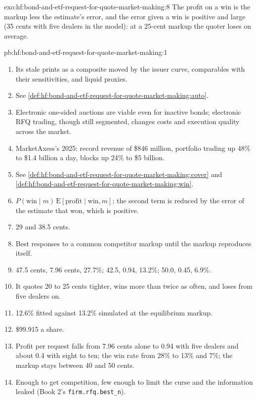 \begin{solution}{exo:hf:bond-and-etf-request-for-quote-market-making:8}
The profit on a win is the markup less the estimate's error, and the error given a win is positive and large (35 cents with five dealers in the
model): at a 25-cent markup the quoter loses on average.
\end{solution}

\begin{solution}{pb:hf:bond-and-etf-request-for-quote-market-making:1}
\begin{enumerate}
\item Its stale prints as a composite moved by the issuer curve, comparables with their sensitivities, and liquid proxies.
\item See \cref{def:hf:bond-and-etf-request-for-quote-market-making:auto}.
\item Electronic one-sided auctions are viable even for inactive bonds; electronic RFQ trading, though still segmented, changes costs and execution
quality across the market.
\item MarketAxess's 2025: record revenue of \$846 million, portfolio trading up 48\% to \$1.4 billion a day, blocks up 24\% to \$5 billion.
\item See \cref{def:hf:bond-and-etf-request-for-quote-market-making:cover} and \cref{def:hf:bond-and-etf-request-for-quote-market-making:win}.
\item $P(\text{win}\mid m)\,\mathrm{E}[\text{profit}\mid\text{win},m]$; the second term is reduced by the error of the estimate that won, which is
positive.
\item 29 and 38.5 cents.
\item Best responses to a common competitor markup until the markup reproduces itself.
\item 47.5 cents, 7.96 cents, 27.7\%; 42.5, 0.94, 13.2\%; 50.0, 0.45, 6.9\%.
\item It quotes 20 to 25 cents tighter, wins more than twice as often, and loses from five dealers on.
\item 12.6\% fitted against 13.2\% simulated at the equilibrium markup.
\item \$99.915 a share.
\item Profit per request falls from 7.96 cents alone to 0.94 with five dealers and about 0.4 with eight to ten; the win rate from 28\% to 13\% and
7\%; the markup stays between 40 and 50 cents.
\item Enough to get competition, few enough to limit the curse and the information leaked (Book 2's \texttt{firm.rfq.best\_n}).

\end{enumerate}
\end{solution}
